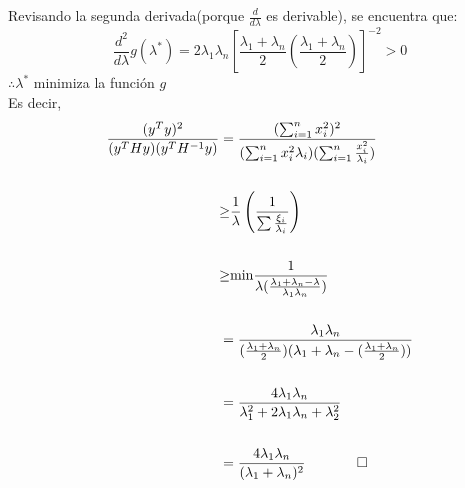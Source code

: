 \documentclass[12pt]{article}
\begin{document}
\begin{enumerate}
	\noindent Revisando la segunda derivada(porque $\frac{d}{d\lambda}$ es derivable), se encuentra que: $$\frac{d^2}{d \lambda} g(\lambda^*) = 2 \lambda_1 \lambda_n \left[\frac{\lambda_1 + \lambda_n}{2}(\frac{\lambda_1 + \lambda_n}{2})\right]^{-2} > 0$$
	\noindent $\therefore \lambda^*$ minimiza la funci\'on $g$\\ 
	\noindent Es decir, 
	\begin{align*}
	 \frac{(y^Ty)^2}{(y^THy)(y^TH^{-1}y)} &= \frac{(\sum_{i=1}^n x_i^2)^2}{(\sum_{i=1}^n x_i^2 \lambda_i )(\sum_{i=1}^n\frac{x_i^2}{\lambda_i})} \\ \\
	  &{\ge} \frac{1}{\lambda}\left(\frac{1}{\sum \frac{\xi_i}{\lambda_i}}\right) \\ \\
	    &{\ge} \text{min} \frac{1}{\lambda(\frac{\lambda_1 + \lambda_n - \lambda}{\lambda_1 \lambda_n})} \\ \\ 
	   &= \frac{\lambda_1 \lambda_n}{(\frac{\lambda_1 + \lambda_n}{2})(\lambda_1 + \lambda_n -(\frac{\lambda_1 + \lambda_n}{2}))} \\ \\
	    &= \frac{4 \lambda_1 \lambda_n}{\lambda_1^2 + 2\lambda_1\lambda_n + \lambda_2^2} \\ \\
	    &= \frac{4 \lambda_1 \lambda_n}{(\lambda_1 + \lambda_n)^2} \ \ \ \ \ \qed
	 \end{align*}

	\end{enumerate}	

\enddocument
\end{document}
